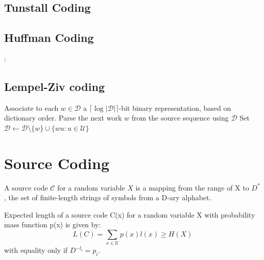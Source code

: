 \documentclass[10pt,a4paper,landscape]{article}
\newcommand{\code}{\mathcal{C}}
\newcommand{\alphabet}{\mathcal{U}}
\begin{document}
\begin{multicols*}{4}
\subsection{Tunstall Coding}

\begin{algorithmic}[1]
\EndWhile
\end{algorithmic}

\subsection{Huffman Coding}

\begin{algorithmic}[1]
:
\EndWhile
{}
\end{algorithmic}

\subsection{Lempel-Ziv coding}
\begin{algorithmic}[1]
	\State {Set $\mathcal D = \alphabet$}
	\Loop
		\State Associate to each $w \in \mathcal D$ a $\lceil \log | \mathcal D | \rceil$-bit binary representation, based on dictionary order.
		\State Parse the next work $w$ from the source sequence using $\mathcal D$
		\State Set $\mathcal D \gets \mathcal D \setminus \{w\} \cup \{ w u: u \in \alphabet \}$
	\EndLoop
\end{algorithmic}

\section{Source Coding}
A source code $\code$ for a random variable $X$ is a mapping from the range of X to $D^*$, the set of finite-length strings of symbols from a D-ary alphabet.

Expected length of a source code C(x) for a random variable X with probability mass function p(x) is given by:
$$L(C) = \sum_{x \in \alphabet} p(x) l(x) \geq H(X)$$
with equality only if $D^{-l_i} = p_i$.


\end{multicols*}
\end{document}
